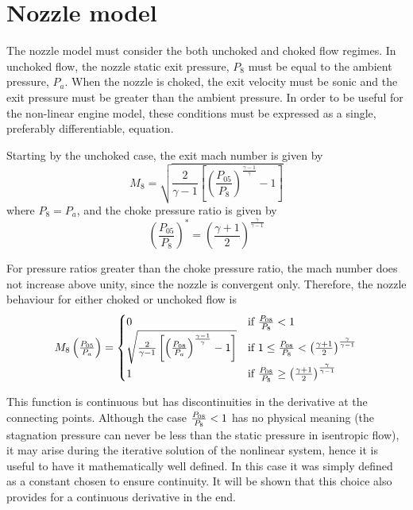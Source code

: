 \documentclass[tcc]{subfiles}
\begin{document}
\section{Nozzle model}
The nozzle model must consider the both unchoked and choked flow regimes. 
In unchoked flow, the nozzle static exit pressure, $P_8$ must be equal to the ambient pressure, $P_a$. 
When the nozzle is choked, the exit velocity must be sonic 
and the exit pressure must be greater than the ambient pressure.
In order to be useful for the non-linear engine model, these conditions must be expressed as a single, preferably differentiable, equation. 

Starting by the unchoked case, the exit mach number is given by
\begin{equation}
    M_8 = \sqrt{\frac{2}{\gamma-1}\left[\left(\frac{P_{05}}{P_8}\right)^{\frac{\gamma-1}{\gamma}}-1\right]}
\end{equation}
where $P_8=P_a$, and the choke pressure ratio is given by
\begin{equation}
    \left(\frac{P_{05}}{P_8}\right)^* = \left(\frac{\gamma+1}{2}\right)^\frac{\gamma}{\gamma-1}
\end{equation}

For pressure ratios greater than the choke pressure ratio, the mach number does not increase above unity, 
since the nozzle is convergent only. Therefore, the nozzle behaviour for either choked or unchoked flow is
\begin{equation}
    \label{eqn:M8}
    M_8\left(\tfrac{P_{05}}{P_a}\right) = \begin{cases}
        0 &\text{if $\frac{P_{08}}{P_{8}} < 1$} \\
        \sqrt{\frac{2}{\gamma-1}\left[\left(\frac{P_{08}}{P_a}\right)^{\frac{\gamma-1}{\gamma}}-1\right]} 
        &\text{if $1 \leq \frac{P_{08}}{P_{8}} <\left(\frac{\gamma+1}{2}\right)^\frac{\gamma}{\gamma-1}$} \\
        1 & \text{if $\frac{P_{08}}{P_{8}} \geq \left(\frac{\gamma+1}{2}\right)^\frac{\gamma}{\gamma-1}$ }
    \end{cases}
\end{equation}


This function is continuous but has discontinuities in the derivative at the connecting points. 
Although the case $\frac{P_{08}}{P_{8}}<1$ has no physical meaning 
(the stagnation pressure can never be less than the static pressure in isentropic flow), 
it may arise during the iterative solution of the nonlinear system, 
hence it is useful to have it mathematically well defined. 
In this case it was simply defined as a constant chosen to ensure continuity. It will be shown that this choice also provides for a continuous derivative in the end.
\end{document}
